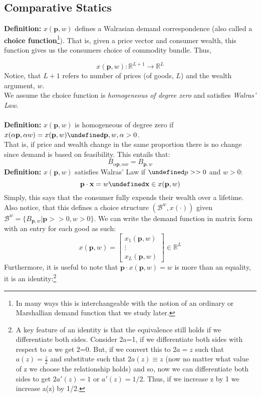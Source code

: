 \documentclass[12pt]{article}
\newcommand{\R}{\mathbb{R}}
\let\oldforall\forall
\let\forall\undefined
\let\bf\oldbf
\let\bf\textbf
\DeclareMathOperator{\forall}{\,\oldforall\,}
\begin{document}
\subsection{Comparative Statics}
\bf{Definition:} $x(\bf{p}, w)$ defines a Walrasian demand correspondence (also called a \bf{choice function}\footnote{In many ways this is interchangeable with the notion of an ordinary or Marshallian demand function that we study later.}). That is, given a price vector and consumer wealth, this function gives us the consumers choice of commodity bundle. Thus,

$$x(\bf{p}, w): \R^{L+1}\rightarrow\R^L$$
Notice, that $L + 1$ refers to number of prices (of goods, $L$) and the wealth argument, $w$.
\vspace{10pt}
\\ We assume the choice function is \emph{homogeneous of degree zero} and satisfies \emph{Walras' Law}.
\\ \bf{\\Definition:} $x(\bf{p}, w)$ is homogeneous of degree zero if $x(\alpha\bf{p}, \alpha w) = x(\bf{p}, w) \forall \bf{p}, w, \alpha > 0$.
\\ That is, if price and wealth change in the same proportion there is no change since demand is based on feasibility. This entails that:
$$B_{\alpha\bf{p}, \alpha w} = B_{\bf{p}, w}$$
\bf{Definition:} $x(\bf{p}, w)$ satisfies Walras' Law if $\forall p >> 0 $ and $w > 0$:
$$\bf{p}\cdot\bf{x} = w \forall \bf{x} \in x(\bf{p}, w)$$
Simply, this says that the consumer fully expends their wealth over a lifetime. 
\\ Also notice, that this defines a choice structure $(\mathcal{B}^w, x(\cdot))$ given $\mathcal{B}^w = \{B_{\bf{p}, w} | \bf{p} >> 0, w > 0 \}$.
We can write the demand function in matrix form with an entry for each good as such:
$$x(\bf{p}, w) = \begin{bmatrix} 
x_1(\bf{p}, w) \\
\vdots \\
x_L(\bf{p}, w) 
\end{bmatrix} \in \R^L$$
Furthermore, it is useful to note that $\bf{p}\cdot x(\bf{p}, w) = w$ is more than an equality, it is an identity:\footnote{A key feature of an identity is that the equivalence still holds if we differentiate both sides. Consider 2a=1, if we differentiate both sides with respect to $a$ we get 2=0. But, if we convert this to $2a=z$ such that $a(z) =\frac{z}{2}$ and substitute such that $2a(z) \equiv z$ (now no matter what value of z we choose the relationship holds) and so, now we can differentiate both sides to get $2a'(z) = 1$ or $a'(z) = 1/2$. Thus, if we increase z by 1 we increase a(z) by 1/2.}
\end{document}
